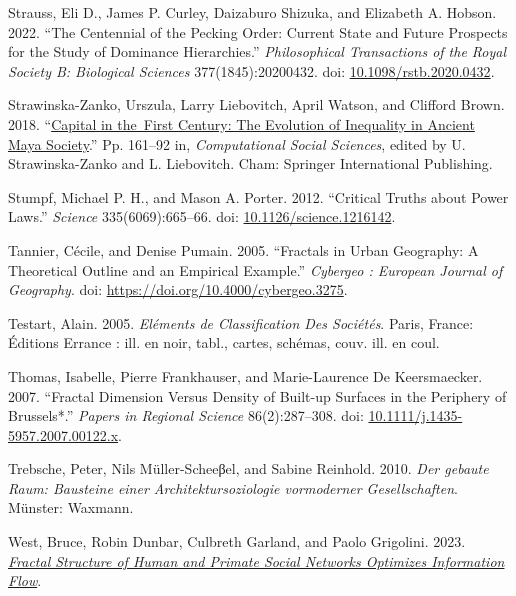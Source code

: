 \documentclass[
  12pt,
]{book}
\newlength{\cslhangindent}
\newlength{\cslentryspacingunit} %
\newenvironment{CSLReferences}[2] %
 {%
  \setlength{\parindent}{0pt}
  \ifodd #1
  \let\oldpar\par
  \def\par{\hangindent=\cslhangindent\oldpar}
  \fi
  \setlength{\parskip}{#2\cslentryspacingunit}
 }%
 {}
\begin{document}
\begin{CSLReferences}{1}{0}
\leavevmode{}%
Strauss, Eli D., James P. Curley, Daizaburo Shizuka, and Elizabeth A. Hobson. 2022. {``The Centennial of the Pecking Order: Current State and Future Prospects for the Study of Dominance Hierarchies.''} \emph{Philosophical Transactions of the Royal Society B: Biological Sciences} 377(1845):20200432. doi: \href{https://doi.org/10.1098/rstb.2020.0432}{10.1098/rstb.2020.0432}.

\leavevmode{}%
Strawinska-Zanko, Urszula, Larry Liebovitch, April Watson, and Clifford Brown. 2018. {``\href{https://doi.org/10.1007/978-3-319-76765-9_9}{Capital in the~First Century: The Evolution of Inequality in Ancient Maya Society}.''} Pp. 161--92 in, \emph{Computational Social Sciences}, edited by U. Strawinska-Zanko and L. Liebovitch. Cham: Springer International Publishing.

\leavevmode{}%
Stumpf, Michael P. H., and Mason A. Porter. 2012. {``Critical Truths about Power Laws.''} \emph{Science} 335(6069):665--66. doi: \href{https://doi.org/10.1126/science.1216142}{10.1126/science.1216142}.

\leavevmode{}%
Tannier, Cécile, and Denise Pumain. 2005. {``Fractals in Urban Geography: A Theoretical Outline and an Empirical Example.''} \emph{Cybergeo : European Journal of Geography}. doi: \url{https://doi.org/10.4000/cybergeo.3275}.

\leavevmode{}%
Testart, Alain. 2005. \emph{Eléments de Classification Des Sociétés}. Paris, France: Éditions Errance : ill. en noir, tabl., cartes, schémas, couv. ill. en coul.

\leavevmode{}%
Thomas, Isabelle, Pierre Frankhauser, and Marie-Laurence De Keersmaecker. 2007. {``Fractal Dimension Versus Density of Built-up Surfaces in the Periphery of Brussels*.''} \emph{Papers in Regional Science} 86(2):287--308. doi: \href{https://doi.org/10.1111/j.1435-5957.2007.00122.x}{10.1111/j.1435-5957.2007.00122.x}.

\leavevmode{}%
Trebsche, Peter, Nils Müller-Scheeβel, and Sabine Reinhold. 2010. \emph{Der gebaute Raum: Bausteine einer Architektursoziologie vormoderner Gesellschaften}. Münster: Waxmann.

\leavevmode{}%
West, Bruce, Robin Dunbar, Culbreth Garland, and Paolo Grigolini. 2023. \emph{\href{https://doi.org/10.1101/2023.02.23.529431}{Fractal Structure of Human and Primate Social Networks Optimizes Information Flow}}.


\end{CSLReferences}
\end{document}
